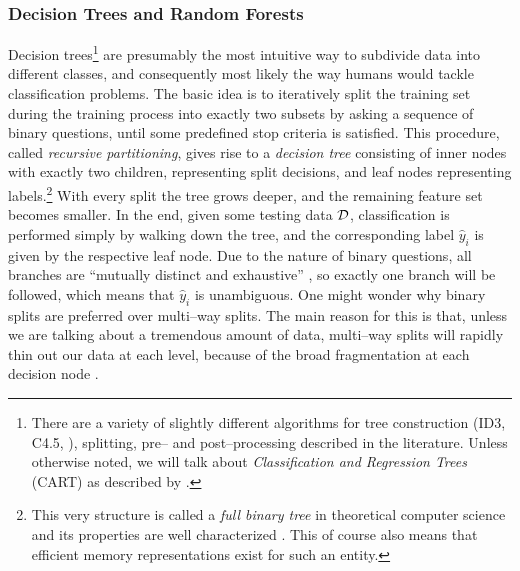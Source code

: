 
\subsubsection{Decision Trees and Random Forests}

Decision trees\footnote{There are a variety of slightly different algorithms for tree construction (ID3, C4.5, \etc), splitting, pre-- and post--processing described in the literature. Unless otherwise noted, we will talk about \emph{Classification and Regression Trees} (CART) as described by \citet{breiman1984}.} \citep{breiman1984} are presumably the most intuitive way to subdivide data into different classes, and consequently most likely the way humans would tackle classification problems. The basic idea is to iteratively split the training set during the training process into exactly two subsets by asking a sequence of binary questions, until some predefined stop criteria is satisfied. This procedure, called \emph{recursive partitioning}, gives rise to a \emph{decision tree} consisting of inner nodes with exactly two children, representing split decisions, and leaf nodes representing labels.\footnote{This very structure is called a \emph{full binary tree} in  theoretical computer science and its properties are well characterized \citep{knuth1981}. This of course also means that efficient memory representations exist for such an entity.} With every split the tree grows deeper, and the remaining feature set becomes smaller. In the end, given some testing data $\mathcal{D}$, classification is performed simply by walking down the tree, and the corresponding label $\hat y_i$ is given by the respective leaf node. Due to the nature of binary questions, all branches are ``mutually distinct and exhaustive'' \citep{duda2001}, so exactly one branch will be followed, which means that $\hat y_i$ is unambiguous. One might wonder why binary splits are preferred over multi--way splits. The main reason for this is that, unless we are talking about a tremendous amount of data, multi--way splits will rapidly thin out our data at each level, because of the broad fragmentation at each decision node \citep{hastie2001}. %
\\



